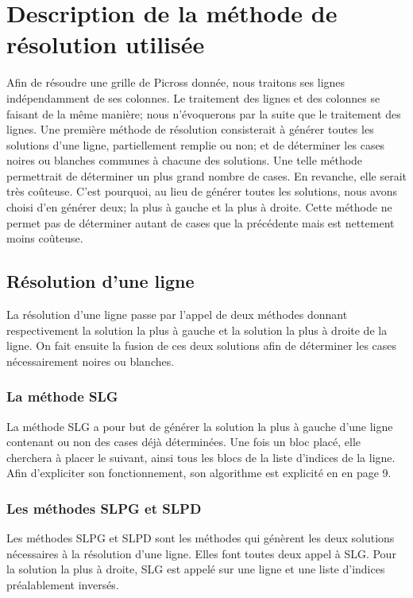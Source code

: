 \documentclass{article}
\begin{document}
\section{Description de la méthode de résolution utilisée}
Afin de résoudre une grille de Picross donnée, nous traitons ses lignes indépendamment de ses colonnes.
Le traitement des lignes et des colonnes se faisant de la même manière; nous n'évoquerons par la suite que le traitement des lignes.
\newline
Une première méthode de résolution consisterait à générer toutes les solutions d'une ligne, partiellement remplie ou non; et de déterminer les cases noires ou blanches communes à chacune des solutions.
Une telle méthode permettrait de déterminer un plus grand nombre de cases. En revanche, elle serait très coûteuse.
\newline
C'est pourquoi, au lieu de générer toutes les solutions, nous avons choisi d'en générer deux; la plus à gauche et la plus à droite. Cette méthode ne permet pas de déterminer autant de cases que la précédente mais est nettement moins coûteuse.
\subsection{Résolution d'une ligne}
La résolution d'une ligne passe par l'appel de deux méthodes donnant respectivement la solution la plus à gauche et la solution la plus à droite de la ligne.
\newline
On fait ensuite la fusion de ces deux solutions afin de déterminer les cases nécessairement noires ou blanches.
\subsubsection{La méthode SLG}
La méthode SLG a pour but de générer la solution la plus à gauche d'une ligne contenant ou non des cases déjà déterminées.
Une fois un bloc placé, elle cherchera à placer le suivant, ainsi tous les blocs de la liste d'indices de la ligne.
Afin d'expliciter son fonctionnement, son algorithme est explicité en en page 9.
\subsubsection{Les méthodes SLPG et SLPD}
Les méthodes SLPG et SLPD sont les méthodes qui génèrent les deux solutions nécessaires à la résolution d'une ligne. Elles font toutes deux appel à SLG. 
\newline
Pour la solution la plus à droite, SLG est appelé sur une ligne et une liste d'indices préalablement inversés.
\end{document}
